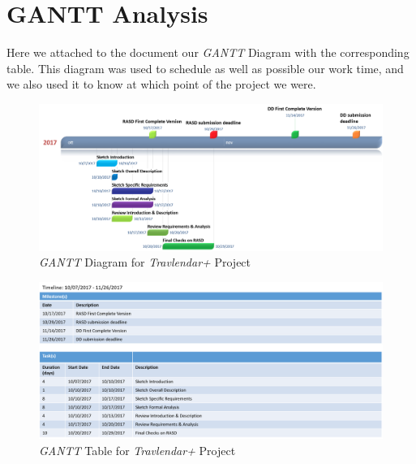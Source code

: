 \section{GANTT Analysis}
Here we attached to the document our \emph{GANTT} Diagram with the corresponding table. This diagram was used to schedule as well as possible our work time, and we also used it to know at which point of the project we were.

\begin{figure}[H]
    \centering
    \includegraphics[scale=0.4]{Pictures/GANTT.png}
    \caption{\emph{GANTT} Diagram for \emph{Travlendar+} Project}
\end{figure}

\begin{figure}[H]
    \centering
    \includegraphics[scale=0.45]{Pictures/GANTTTable.png}
    \caption{\emph{GANTT} Table for \emph{Travlendar+} Project}
\end{figure}